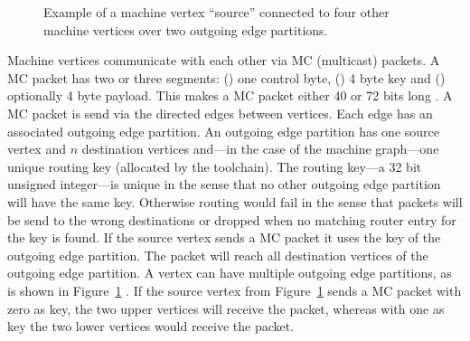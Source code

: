 \documentclass[]{article}
\begin{document}
\begin{figure} %
\begin{center}
\end{center}
\caption{Example of a machine vertex ``source'' connected to four
  other machine vertices over two outgoing edge partitions.}
\label{fig:partitions}
\end{figure} %

Machine vertices communicate with each other via MC (multicast)
packets.
A MC packet has two or three segments:
() one control byte, () 4 byte key
and () optionally 4 byte payload.
This makes a MC packet either 40 or 72 bits long
\citep{furber_et_al_2020}.
A MC packet is send via the directed edges between vertices.
Each edge has an associated outgoing edge partition.
An outgoing edge partition has one source vertex and $n$ destination
vertices and---in the case of the machine graph---one unique
routing key (allocated by the toolchain).
The routing key---a 32 bit unsigned integer---is unique in the sense
that no other outgoing edge partition will have the same key.
Otherwise routing would fail in the sense that packets will be send
to the wrong destinations or dropped when no matching router entry for
the key is found.
If the source vertex sends a MC packet it uses the key of the
outgoing edge partition.
The packet will reach all destination vertices of the outgoing edge
partition.
A vertex can have multiple outgoing edge partitions, as is shown in
Figure~\ref{fig:partitions} \citep{furber_et_al_2020}.
If the source vertex from Figure~\ref{fig:partitions} sends a MC
packet with zero as key, the two upper vertices will receive the
packet, whereas with one as key the two lower vertices would receive
the packet.
\end{document}

